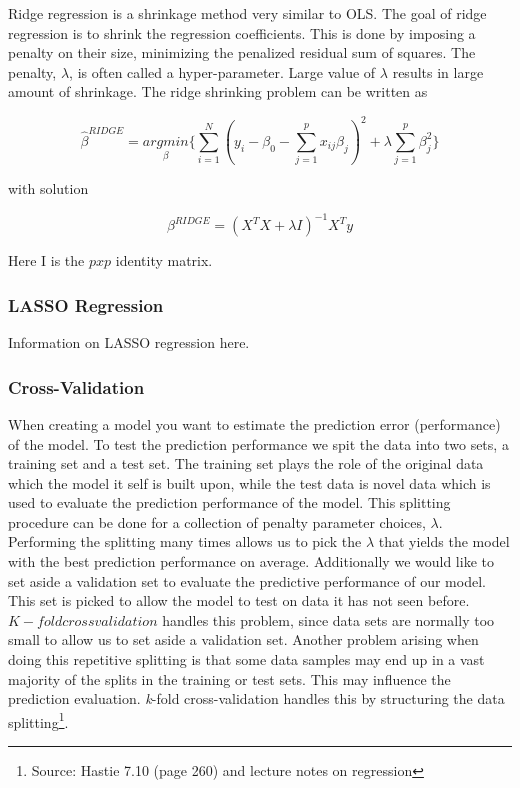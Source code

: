 \documentclass[12pt]{article}
\begin{document}
\begin{multicols}{2}
Ridge regression is a shrinkage method very similar to OLS. The goal of ridge regression is to shrink the regression coefficients. This is done by imposing a penalty on their size, minimizing the penalized residual sum of squares. The penalty, $\lambda$, is often called a hyper-parameter. Large value of $\lambda$ results in large amount of shrinkage. The ridge shrinking problem can be written as

$$\hat{\beta}^{RIDGE}=\underset{\beta}{argmin}\lbrace\sum\limits_{i=1}^N(y_i-\beta_0-\sum\limits_{j=1}^px_{ij}\beta_j)^2+\lambda\sum\limits_{j=1}^p\beta_j^2\rbrace$$

with solution 

$$\beta^{RIDGE}=(X^T X + \lambda I)^{-1} X^T y$$

Here I is the $pxp$ identity matrix. 

\subsubsection{LASSO Regression}

Information on LASSO regression here. 

\subsubsection{Cross-Validation}

When creating a model you want to estimate the prediction error (performance) of the model. To test the prediction performance we spit the data into two sets, a training set and a test set. The training set plays the role of the original data which the model it self is built upon, while the test data is novel data which is used to evaluate the prediction performance of the model. This splitting procedure can be done for a collection of penalty parameter choices, $\lambda$. Performing the splitting many times allows us to pick the $\lambda$ that yields the model with the best prediction performance on average. Additionally we would like to set aside a validation set to evaluate the predictive performance of our model. This set is picked to allow the model to test on data it has not seen before. $K-fold cross validation$ handles this problem, since data sets are normally too small to allow us to set aside a validation set. Another problem arising when doing this repetitive splitting is that some data samples may end up in a vast majority of the splits in the training or test sets. This may influence the prediction evaluation. \textit{k}-fold cross-validation handles this by structuring the data splitting\footnote{Source: Hastie 7.10 (page 260) and lecture notes on regression}.


\end{multicols}
\end{document}
